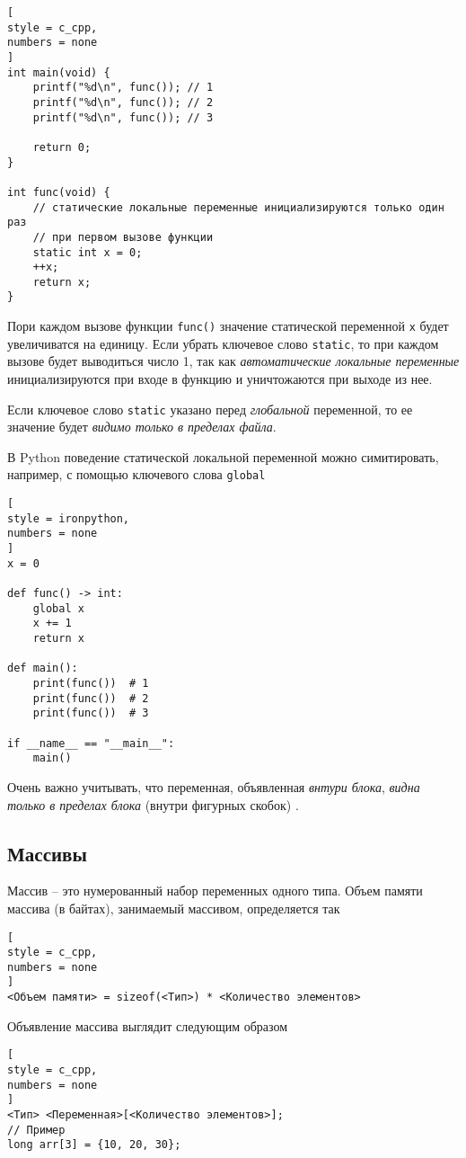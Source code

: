 \documentclass[%
	11pt,
	a4paper,
	utf8,
		]{article}
\begin{document}
\begin{itemize}
\begin{lstlisting}[
style = c_cpp,
numbers = none
]
int main(void) {
    printf("%d\n", func()); // 1
    printf("%d\n", func()); // 2
    printf("%d\n", func()); // 3
    
    return 0;
}

int func(void) {
	// статические локальные переменные инициализируются только один раз
	// при первом вызове функции
    static int x = 0;  
    ++x;
    return x;
}
\end{lstlisting}

Пори каждом вызове функции \verb*|func()| значение статической переменной \verb|x| будет увеличиватся на единицу. Если убрать ключевое слово \verb*|static|, то при каждом вызове будет выводиться число 1, так как \emph{автоматические локальные переменные} инициализируются при входе в функцию и уничтожаются при выходе из нее.

Если ключевое слово \verb|static| указано перед \emph{глобальной} переменной, то ее значение будет \emph{видимо только в пределах файла}.
\end{itemize}

В Python поведение статической локальной переменной можно симитировать, например, с помощью ключевого слова \verb*|global|
\begin{lstlisting}[
style = ironpython,
numbers = none
]
x = 0

def func() -> int:
    global x
    x += 1
    return x

def main():
	print(func())  # 1
	print(func())  # 2
	print(func())  # 3
	
if __name__ == "__main__":
    main()
\end{lstlisting}

Очень важно учитывать, что переменная, объявленная \emph{внтури блока}, \emph{видна} \emph{только в пределах блока} (внутри фигурных скобок) \cite[]{prokhorenok-prog-c:2020}.

\subsection{Массивы}

Массив -- это нумерованный набор переменных одного типа. Объем памяти массива (в байтах), занимаемый массивом, определяется так
\begin{lstlisting}[
style = c_cpp,
numbers = none
]
<Объем памяти> = sizeof(<Тип>) * <Количество элементов>
\end{lstlisting}

Объявление массива выглядит следующим образом
\begin{lstlisting}[
style = c_cpp,
numbers = none
]
<Тип> <Переменная>[<Количество элементов>];
// Пример
long arr[3] = {10, 20, 30};
\end{lstlisting}
\end{document}
